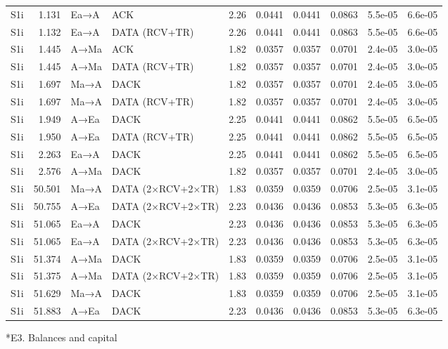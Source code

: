 \documentclass[10pt,letterpaper]{article}
\makeatletter
\renewcommand\section{\@startsection{section}{1}{\z@}{-9pt plus -2pt minus -1pt}{3pt}{\normalfont\large\bfseries}}
\makeatother
\begin{document}
{\begin{longtable}{@{}lrllrrrrrr@{}}
S1i & 1.131 & Ea→A & ACK & 2.26 & 0.0441 & 0.0441 & 0.0863 & 5.5e-05 & 6.6e-05 \\
S1i & 1.132 & Ea→A & DATA (RCV+TR) & 2.26 & 0.0441 & 0.0441 & 0.0863 & 5.5e-05 & 6.6e-05 \\
S1i & 1.445 & A→Ma & ACK & 1.82 & 0.0357 & 0.0357 & 0.0701 & 2.4e-05 & 3.0e-05 \\
S1i & 1.445 & A→Ma & DATA (RCV+TR) & 1.82 & 0.0357 & 0.0357 & 0.0701 & 2.4e-05 & 3.0e-05 \\
S1i & 1.697 & Ma→A & DACK & 1.82 & 0.0357 & 0.0357 & 0.0701 & 2.4e-05 & 3.0e-05 \\
S1i & 1.697 & Ma→A & DATA (RCV+TR) & 1.82 & 0.0357 & 0.0357 & 0.0701 & 2.4e-05 & 3.0e-05 \\
S1i & 1.949 & A→Ea & DACK & 2.25 & 0.0441 & 0.0441 & 0.0862 & 5.5e-05 & 6.5e-05 \\
S1i & 1.950 & A→Ea & DATA (RCV+TR) & 2.25 & 0.0441 & 0.0441 & 0.0862 & 5.5e-05 & 6.5e-05 \\
S1i & 2.263 & Ea→A & DACK & 2.25 & 0.0441 & 0.0441 & 0.0862 & 5.5e-05 & 6.5e-05 \\
S1i & 2.576 & A→Ma & DACK & 1.82 & 0.0357 & 0.0357 & 0.0701 & 2.4e-05 & 3.0e-05 \\
S1i & 50.501 & Ma→A & DATA (2×RCV+2×TR) & 1.83 & 0.0359 & 0.0359 & 0.0706 & 2.5e-05 & 3.1e-05 \\
S1i & 50.755 & A→Ea & DATA (2×RCV+2×TR) & 2.23 & 0.0436 & 0.0436 & 0.0853 & 5.3e-05 & 6.3e-05 \\
S1i & 51.065 & Ea→A & DACK & 2.23 & 0.0436 & 0.0436 & 0.0853 & 5.3e-05 & 6.3e-05 \\
S1i & 51.065 & Ea→A & DATA (2×RCV+2×TR) & 2.23 & 0.0436 & 0.0436 & 0.0853 & 5.3e-05 & 6.3e-05 \\
S1i & 51.374 & A→Ma & DACK & 1.83 & 0.0359 & 0.0359 & 0.0706 & 2.5e-05 & 3.1e-05 \\
S1i & 51.375 & A→Ma & DATA (2×RCV+2×TR) & 1.83 & 0.0359 & 0.0359 & 0.0706 & 2.5e-05 & 3.1e-05 \\
S1i & 51.629 & Ma→A & DACK & 1.83 & 0.0359 & 0.0359 & 0.0706 & 2.5e-05 & 3.1e-05 \\
S1i & 51.883 & A→Ea & DACK & 2.23 & 0.0436 & 0.0436 & 0.0853 & 5.3e-05 & 6.3e-05 \\
\end{longtable}}


\section*{E3. Balances and capital}
\end{document}
